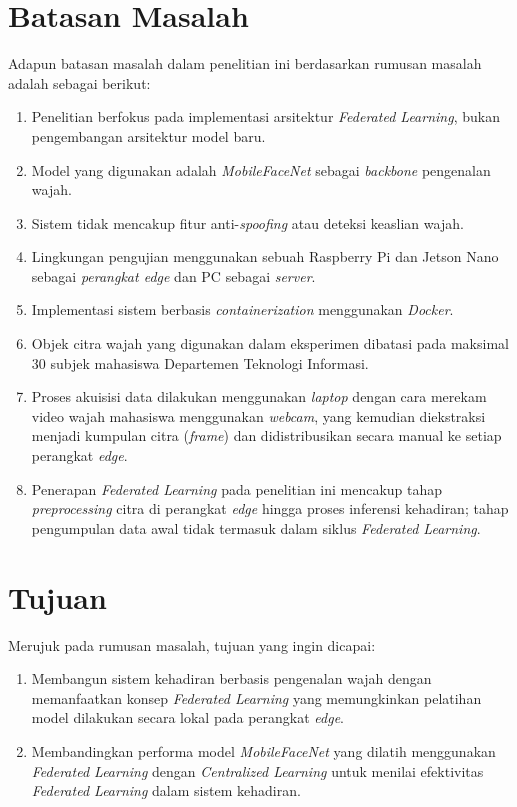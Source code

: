 \section{Batasan Masalah}
\label{sec:batasan-masalah}

Adapun batasan masalah dalam penelitian ini berdasarkan rumusan masalah adalah sebagai berikut:
\begin{enumerate}[itemsep=1pt]
    \item Penelitian berfokus pada implementasi arsitektur \textit{Federated Learning}, bukan pengembangan arsitektur model baru.
    \item Model yang digunakan adalah \textit{MobileFaceNet} sebagai \textit{backbone} pengenalan wajah.
    \item Sistem tidak mencakup fitur anti-\textit{spoofing} atau deteksi keaslian wajah.
    \item Lingkungan pengujian menggunakan sebuah Raspberry Pi dan Jetson Nano sebagai \textit{perangkat edge} dan PC sebagai \textit{server}.
    \item Implementasi sistem berbasis \textit{containerization} menggunakan \textit{Docker}.
    \item Objek citra wajah yang digunakan dalam eksperimen dibatasi pada maksimal 30 subjek mahasiswa Departemen Teknologi Informasi.
    \item Proses akuisisi data dilakukan menggunakan \textit{laptop} dengan cara merekam video wajah mahasiswa menggunakan \textit{webcam}, yang kemudian diekstraksi menjadi kumpulan citra (\textit{frame}) dan didistribusikan secara manual ke setiap perangkat \textit{edge}.
    \item Penerapan \textit{Federated Learning} pada penelitian ini mencakup tahap \textit{preprocessing} citra di perangkat \textit{edge} hingga proses inferensi kehadiran; tahap pengumpulan data awal tidak termasuk dalam siklus \textit{Federated Learning}.
\end{enumerate}

\section{Tujuan}
\label{sec:tujuan}

Merujuk pada rumusan masalah, tujuan yang ingin dicapai:
\begin{enumerate}[itemsep=1pt]
    \item Membangun sistem kehadiran berbasis pengenalan wajah dengan memanfaatkan konsep \textit{Federated Learning} yang memungkinkan pelatihan model dilakukan secara lokal pada perangkat \textit{edge}.
    \item Membandingkan performa model \textit{MobileFaceNet} yang dilatih menggunakan \textit{Federated Learning} dengan \textit{Centralized Learning} untuk menilai efektivitas \textit{Federated Learning} dalam sistem kehadiran.
\end{enumerate}

